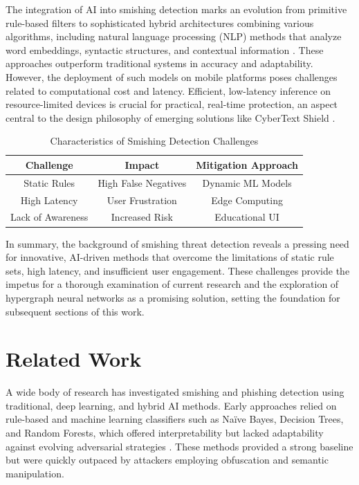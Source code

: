 \documentclass[conference]{IEEEtran}
\begin{document}
The integration of AI into smishing detection marks an evolution from primitive rule-based filters to sophisticated hybrid architectures combining various algorithms, including natural language processing (NLP) methods that analyze word embeddings, syntactic structures, and contextual information \cite{ref3,ref4}. These approaches outperform traditional systems in accuracy and adaptability. However, the deployment of such models on mobile platforms poses challenges related to computational cost and latency. Efficient, low-latency inference on resource-limited devices is crucial for practical, real-time protection, an aspect central to the design philosophy of emerging solutions like CyberText Shield \cite{ref9}.



\begin{table}[htbp]
\caption{Characteristics of Smishing Detection Challenges}
\label{tab:background_challenges}
\centering
\begin{tabular}{|c|c|c|}
\hline
Challenge & Impact & Mitigation Approach \\
\hline
Static Rules & High False Negatives & Dynamic ML Models \\
\hline
High Latency & User Frustration & Edge Computing \\
\hline
Lack of Awareness & Increased Risk & Educational UI \\
\hline
\end{tabular}
\end{table}

In summary, the background of smishing threat detection reveals a pressing need for innovative, AI-driven methods that overcome the limitations of static rule sets, high latency, and insufficient user engagement. These challenges provide the impetus for a thorough examination of current research and the exploration of hypergraph neural networks as a promising solution, setting the foundation for subsequent sections of this work.


\section{Related Work}
\IEEEoverridecommandlockouts

A wide body of research has investigated smishing and phishing detection using traditional, deep learning, and hybrid AI methods. Early approaches relied on rule-based and machine learning classifiers such as Naïve Bayes, Decision Trees, and Random Forests, which offered interpretability but lacked adaptability against evolving adversarial strategies \cite{ref1,ref8}. These methods provided a strong baseline but were quickly outpaced by attackers employing obfuscation and semantic manipulation.  
\end{document}
